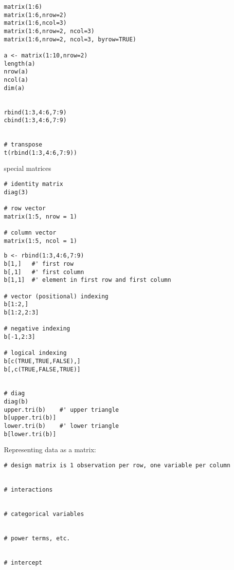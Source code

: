 \documentclass[a4paper,12pt]{article}
\begin{document}
\begin{lstlisting}
matrix(1:6)
matrix(1:6,nrow=2)
matrix(1:6,ncol=3)
matrix(1:6,nrow=2, ncol=3)
matrix(1:6,nrow=2, ncol=3, byrow=TRUE)

a <- matrix(1:10,nrow=2)
length(a)
nrow(a)
ncol(a)
dim(a)


rbind(1:3,4:6,7:9)
cbind(1:3,4:6,7:9)


# transpose
t(rbind(1:3,4:6,7:9))

\end{lstlisting}


special matrices

\begin{lstlisting}
# identity matrix
diag(3)

# row vector
matrix(1:5, nrow = 1)

# column vector
matrix(1:5, ncol = 1)
\end{lstlisting}





\begin{lstlisting}
b <- rbind(1:3,4:6,7:9)
b[1,]	#' first row
b[,1]	#' first column
b[1,1]	#' element in first row and first column

# vector (positional) indexing
b[1:2,]
b[1:2,2:3]

# negative indexing
b[-1,2:3]

# logical indexing
b[c(TRUE,TRUE,FALSE),]
b[,c(TRUE,FALSE,TRUE)]


# diag
diag(b)
upper.tri(b)	#' upper triangle
b[upper.tri(b)]
lower.tri(b)	#' lower triangle
b[lower.tri(b)]
\end{lstlisting}




Representing data as a matrix:

\begin{lstlisting}
# design matrix is 1 observation per row, one variable per column


# interactions


# categorical variables


# power terms, etc.


# intercept


\end{lstlisting}





\end{document}
